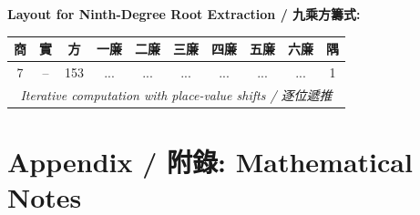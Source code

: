 \documentclass[11pt,a4paper]{article}
\begin{document}
\vspace{0.5em}
\noindent\textbf{Layout for Ninth-Degree Root Extraction / 九乘方籌式:}
\begin{center}
\begin{tabular}{|c|c|c|c|c|c|c|c|c|c|}
\hline
商 & 實 & 方 & 一廉 & 二廉 & 三廉 & 四廉 & 五廉 & 六廉 & 隅 \\
\hline
7 & -- & 153 & ... & ... & ... & ... & ... & ... & 1 \\
\hline
\multicolumn{10}{|c|}{\textit{Iterative computation with place-value shifts / 逐位遞推}} \\
\hline
\end{tabular}
\end{center}

\newpage

\section*{Appendix / 附錄: Mathematical Notes}
\end{document}
